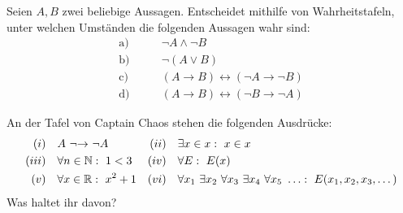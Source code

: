 	
\begin{aufg}[Wahrheitstafeln]
    Seien $A,B$ zwei beliebige Aussagen. Entscheidet mithilfe von Wahrheitstafeln, unter welchen Umständen die folgenden Aussagen wahr sind:
    \begin{align*}
        \text{a)}&\qquad \neg A \land \neg B \\
        \text{b)}&\qquad \neg(A\lor B) \\
        \text{c)}&\qquad (A\to B)\leftrightarrow(\neg A \to \neg B) \\
        \text{d)}&\qquad (A\to B)\leftrightarrow(\neg B \to \neg A)
    \end{align*}
\end{aufg}


\begin{aufg}[freestyle]
    An der Tafel von Captain Chaos stehen die folgenden Ausdrücke:
    \begin{align*}
        (i)\quad& A\ {\neg}{\to}\ \neg A&(ii)\quad& \exists x\in x:\ x\in x  \\
        (iii)\quad&   \forall n\in \N:\ 1<3 & (iv)\quad& \forall E :\ E(x) \\
        (v)\quad& \forall x\in \R :\ x^2+1 &(vi)\quad& \forall x_1\ \exists x_2\ \forall x_3\ \exists x_4\ \forall x_5\ \ldots:\ E(x_1,x_2,x_3,\dots)
    \end{align*}
    Was haltet ihr davon?
\end{aufg}

